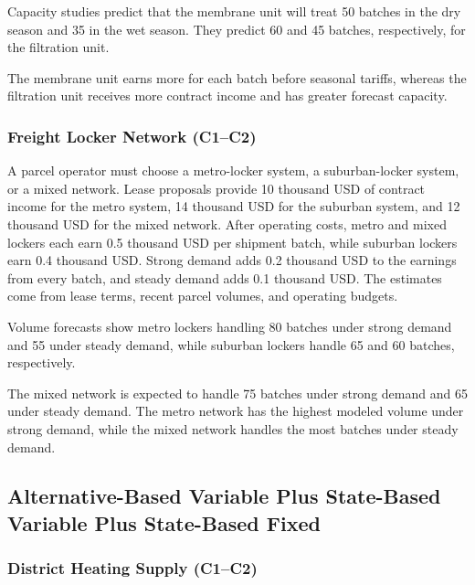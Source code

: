 	Capacity studies predict that the membrane unit will treat 50 batches in the dry season and 35 in the wet season. They predict 60 and 45 batches, respectively, for the filtration unit.
	
	The membrane unit earns more for each batch before seasonal tariffs, whereas the filtration unit receives more contract income and has greater forecast capacity.
	
	\subsubsection{Freight Locker Network (C1--C2)}
	\label{sec:problem27-freight-locker-network-c1-c2}
	
	A parcel operator must choose a metro-locker system, a suburban-locker system, or a mixed network. Lease proposals provide 10 thousand USD of contract income for the metro system, 14 thousand USD for the suburban system, and 12 thousand USD for the mixed network. After operating costs, metro and mixed lockers each earn 0.5 thousand USD per shipment batch, while suburban lockers earn 0.4 thousand USD. Strong demand adds 0.2 thousand USD to the earnings from every batch, and steady demand adds 0.1 thousand USD. The estimates come from lease terms, recent parcel volumes, and operating budgets.
	
	Volume forecasts show metro lockers handling 80 batches under strong demand and 55 under steady demand, while suburban lockers handle 65 and 60 batches, respectively.
	
	The mixed network is expected to handle 75 batches under strong demand and 65 under steady demand. The metro network has the highest modeled volume under strong demand, while the mixed network handles the most batches under steady demand.
	
	\subsection{Alternative-Based Variable Plus State-Based Variable Plus State-Based Fixed}
	\label{sec:alternative-based-variable-payoff-plus-state-based-variable-payoff-plus-state-based-fixed-payoff}



	\subsubsection{District Heating Supply (C1--C2)}
	\label{sec:problem28-district-heating-supply-c1-c2}
	
